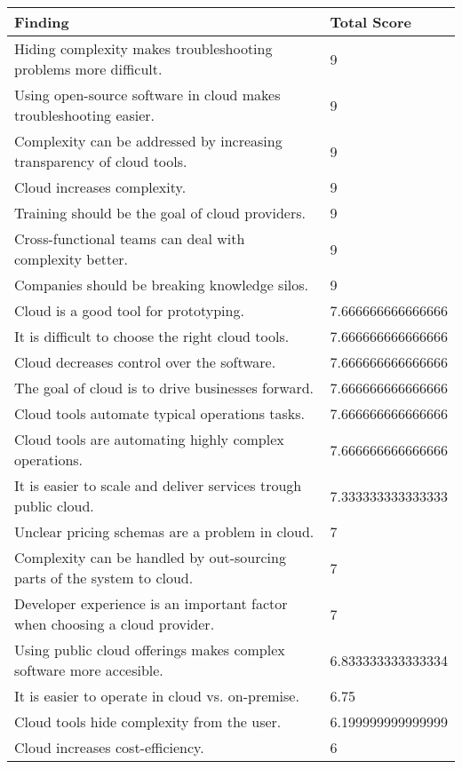 
\renewcommand\arraystretch{1.5}%
\begin{longtable}{|p{10cm}|p{2cm}|}
\hline
\textbf{Finding}  & \textbf{Total Score} \\ \hline
\endhead
Hiding complexity makes troubleshooting problems more difficult. & 9 \\ \hline
Using open-source software in cloud makes troubleshooting easier. & 9 \\ \hline
Complexity can be addressed by increasing transparency of cloud tools. & 9 \\ \hline
Cloud increases complexity. & 9 \\ \hline
Training should be the goal of cloud providers. & 9 \\ \hline
Cross-functional teams can deal with complexity better. & 9 \\ \hline
Companies should be breaking knowledge silos. & 9 \\ \hline
Cloud is a good tool for prototyping. & 7.666666666666666 \\ \hline
It is difficult to choose the right cloud tools. & 7.666666666666666 \\ \hline
Cloud decreases control over the software. & 7.666666666666666 \\ \hline
The goal of cloud is to drive businesses forward. & 7.666666666666666 \\ \hline
Cloud tools automate typical operations tasks. & 7.666666666666666 \\ \hline
Cloud tools are automating highly complex operations. & 7.666666666666666 \\ \hline
It is easier to scale and deliver services trough public cloud. & 7.333333333333333 \\ \hline
Unclear pricing schemas are a problem in cloud. & 7 \\ \hline
Complexity can be handled by out-sourcing parts of the system to cloud. & 7 \\ \hline
Developer experience is an important factor when choosing a cloud provider. & 7 \\ \hline
Using public cloud offerings makes complex software more accesible. & 6.833333333333334 \\ \hline
It is easier to operate in cloud vs. on-premise. & 6.75 \\ \hline
Cloud tools hide complexity from the user. & 6.199999999999999 \\ \hline
Cloud increases cost-efficiency. & 6 \\ \hline

\end{longtable}
